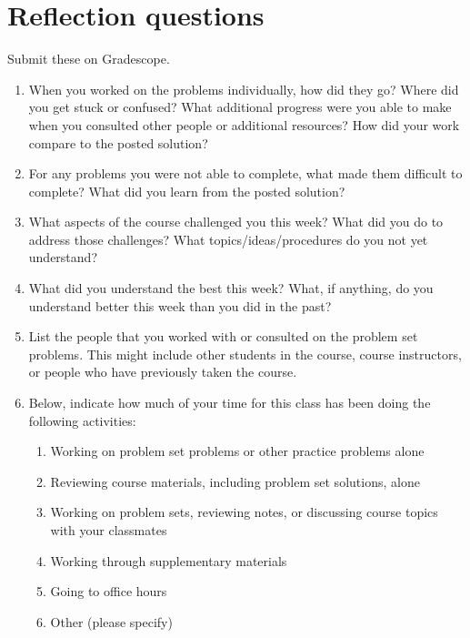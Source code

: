 \documentclass[12pt,letterpaper]{exam}
\begin{document}



\section*{Reflection questions}
Submit these on Gradescope.
\begin{enumerate}
\item When you worked on the problems individually, how did they go?  Where did you get stuck or confused?  What additional progress were you able to make when you consulted other people or additional resources? How did your work compare to the posted solution?
\item For any problems you were not able to complete, what made them difficult to complete?  What did you learn from the posted solution?
\item What aspects of the course challenged you this week?  What did you do to address those challenges?  What topics/ideas/procedures do you not yet understand?
\item What did you understand the best this week?  What, if anything, do you understand better this week than you did in the past?
\item List the people that you worked with or consulted on the problem set problems.  This might include other students in the course, course instructors, or people who have previously taken the course.
\item Below, indicate how much of your time for this class has been doing the following activities:
	\begin{enumerate}
	\item Working on problem set problems or other practice problems alone
	\item Reviewing course materials, including problem set solutions, alone
	\item Working on problem sets, reviewing notes, or discussing course topics with your classmates
	\item Working through supplementary materials
	\item Going to office hours
	\item Other (please specify)
	\end{enumerate}

\end{enumerate}
\end{document}
